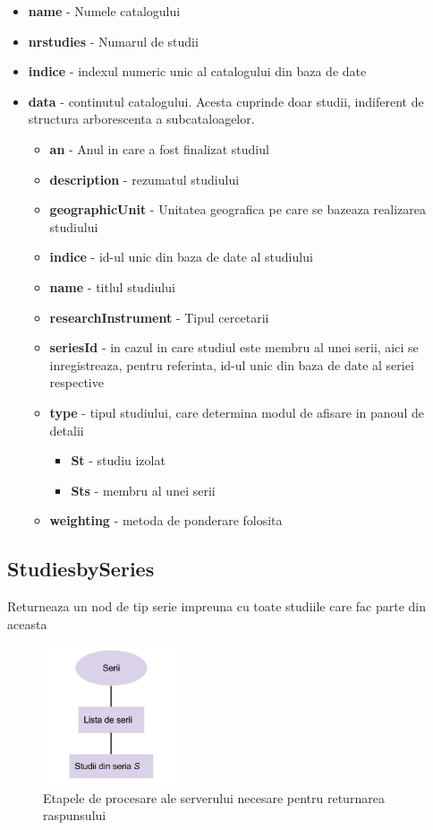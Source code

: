 \begin{itemize}
\item \textbf{name} - Numele catalogului 
\item \textbf{nrstudies} - Numarul de studii 
\item \textbf{indice} - indexul numeric unic al catalogului din baza de
date 
\item \textbf{data} - continutul catalogului. Acesta cuprinde doar studii,
indiferent de structura arborescenta a subcataloagelor.

\begin{itemize}
\item \textbf{an} - Anul in care a fost finalizat studiul 
\item \textbf{description} - rezumatul studiului 
\item \textbf{geographicUnit} - Unitatea geografica pe care se bazeaza realizarea
studiului 
\item \textbf{indice} - id-ul unic din baza de date al studiului 
\item \textbf{name} - titlul studiului 
\item \textbf{researchInstrument} - Tipul cercetarii 
\item \textbf{seriesId} - in cazul in care studiul este membru al unei serii,
aici se inregistreaza, pentru referinta, id-ul unic din baza de date
al seriei respective 
\item \textbf{type} - tipul studiului, care determina modul de afisare in
panoul de detalii 

\begin{itemize}
\item \textbf{St} - studiu izolat 
\item \textbf{Sts }- membru al unei serii 
\end{itemize}
\item \textbf{weighting} - metoda de ponderare folosita 
\end{itemize}
\end{itemize}

\subsection{StudiesbySeries}

Returneaza un nod de tip serie impreuna cu toate studiile care fac
parte din aceasta

\begin{figure}[H]
\begin{centering}
\includegraphics[width=4cm]{img/series}
\par\end{centering}
\caption{Etapele de procesare ale serverului necesare pentru returnarea raspunsului}
\end{figure}

